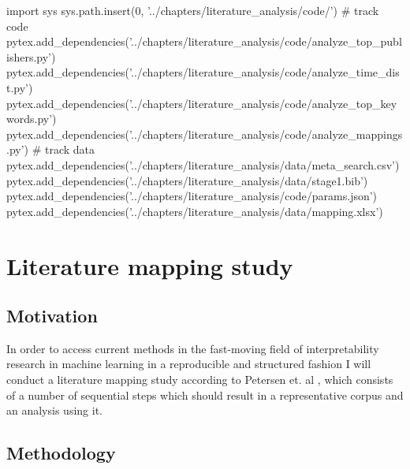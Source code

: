 % 
\begin{pycode}
import sys
sys.path.insert(0, '../chapters/literature_analysis/code/')
# track code
pytex.add_dependencies('../chapters/literature_analysis/code/analyze_top_publishers.py')
pytex.add_dependencies('../chapters/literature_analysis/code/analyze_time_dist.py')
pytex.add_dependencies('../chapters/literature_analysis/code/analyze_top_keywords.py')
pytex.add_dependencies('../chapters/literature_analysis/code/analyze_mappings.py')
# track data
pytex.add_dependencies('../chapters/literature_analysis/data/meta_search.csv')
pytex.add_dependencies('../chapters/literature_analysis/data/stage1.bib')
pytex.add_dependencies('../chapters/literature_analysis/code/params.json')
pytex.add_dependencies('../chapters/literature_analysis/data/mapping.xlsx')
\end{pycode}

\chapter{Literature mapping study}

\section{Motivation}

In order to access current methods in the fast-moving field of interpretability research in machine learning in a reproducible and structured fashion I will conduct a literature mapping study according to Petersen et. al \cite{petersenSystematicMappingStudies}, which consists of a number of sequential steps which should result in a representative corpus and an analysis using it.

\section{Methodology}

